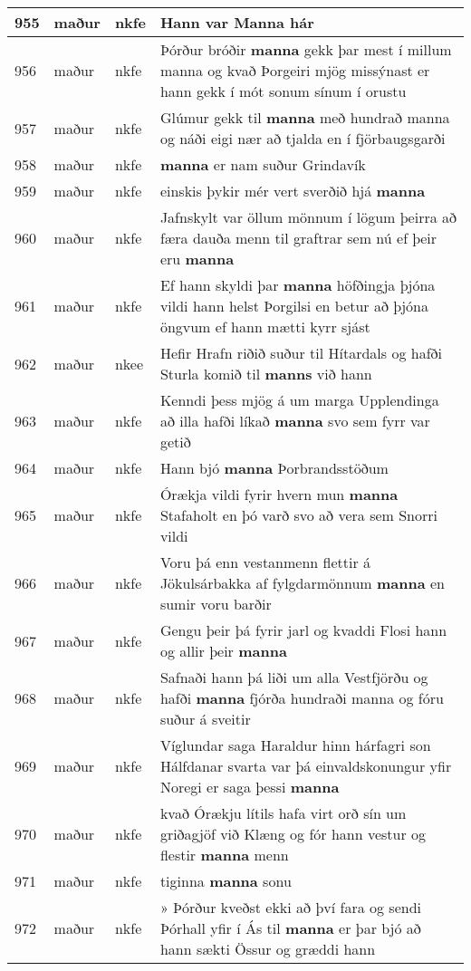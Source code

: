 \documentclass{article}
\begin{document}
\begin{longtable}{p{1cm}|p{1cm}|p{1cm}|p{13cm}}
\hline
955&maður&nkfe&Hann var \textbf{Manna} hár\\
\hline
956&maður&nkfe&Þórður bróðir \textbf{manna} gekk þar mest í millum manna og kvað Þorgeiri mjög missýnast er hann gekk í mót sonum sínum í orustu\\
\hline
957&maður&nkfe&Glúmur gekk til \textbf{manna} með hundrað manna og náði eigi nær að tjalda en í fjörbaugsgarði\\
\hline
958&maður&nkfe& \textbf{manna} er nam suður Grindavík\\
\hline
959&maður&nkfe&einskis þykir mér vert sverðið hjá \textbf{manna} \\
\hline
960&maður&nkfe&Jafnskylt var öllum mönnum í lögum þeirra að færa dauða menn til graftrar sem nú ef þeir eru \textbf{manna} \\
\hline
961&maður&nkfe&Ef hann skyldi þar \textbf{manna} höfðingja þjóna vildi hann helst Þorgilsi en betur að þjóna öngvum ef hann mætti kyrr sjást\\
\hline
962&maður&nkee&Hefir Hrafn riðið suður til Hítardals og hafði Sturla komið til \textbf{manns} við hann\\
\hline
963&maður&nkfe&Kenndi þess mjög á um marga Upplendinga að illa hafði líkað \textbf{manna} svo sem fyrr var getið\\
\hline
964&maður&nkfe&Hann bjó \textbf{manna} Þorbrandsstöðum\\
\hline
965&maður&nkfe&Órækja vildi fyrir hvern mun \textbf{manna} Stafaholt en þó varð svo að vera sem Snorri vildi\\
\hline
966&maður&nkfe&Voru þá enn vestanmenn flettir á Jökulsárbakka af fylgdarmönnum \textbf{manna} en sumir voru barðir\\
\hline
967&maður&nkfe&Gengu þeir þá fyrir jarl og kvaddi Flosi hann og allir þeir \textbf{manna} \\
\hline
968&maður&nkfe&Safnaði hann þá liði um alla Vestfjörðu og hafði \textbf{manna} fjórða hundraði manna og fóru suður á sveitir\\
\hline
969&maður&nkfe&Víglundar saga Haraldur hinn hárfagri son Hálfdanar svarta var þá einvaldskonungur yfir Noregi er saga þessi \textbf{manna} \\
\hline
970&maður&nkfe&kvað Órækju lítils hafa virt orð sín um griðagjöf við Klæng og fór hann vestur og flestir \textbf{manna} menn\\
\hline
971&maður&nkfe&tiginna \textbf{manna} sonu\\
\hline
972&maður&nkfe&» Þórður kveðst ekki að því fara og sendi Þórhall yfir í Ás til \textbf{manna} er þar bjó að hann sækti Össur og græddi hann\\

\end{longtable}
\end{document}
